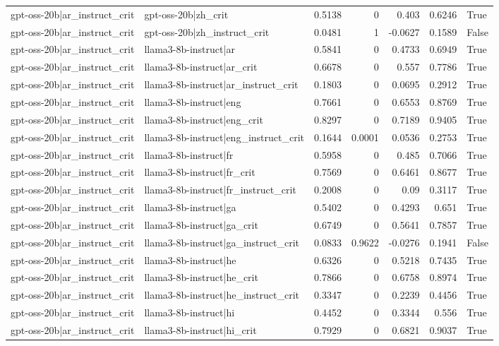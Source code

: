 \begin{table}
\begin{tabular}{l l r r r r l}
gpt-oss-20b|ar_instruct_crit & gpt-oss-20b|zh_crit & 0.5138 & 0 & 0.403 & 0.6246 & True \\
gpt-oss-20b|ar_instruct_crit & gpt-oss-20b|zh_instruct_crit & 0.0481 & 1 & -0.0627 & 0.1589 & False \\
gpt-oss-20b|ar_instruct_crit & llama3-8b-instruct|ar & 0.5841 & 0 & 0.4733 & 0.6949 & True \\
gpt-oss-20b|ar_instruct_crit & llama3-8b-instruct|ar_crit & 0.6678 & 0 & 0.557 & 0.7786 & True \\
gpt-oss-20b|ar_instruct_crit & llama3-8b-instruct|ar_instruct_crit & 0.1803 & 0 & 0.0695 & 0.2912 & True \\
gpt-oss-20b|ar_instruct_crit & llama3-8b-instruct|eng & 0.7661 & 0 & 0.6553 & 0.8769 & True \\
gpt-oss-20b|ar_instruct_crit & llama3-8b-instruct|eng_crit & 0.8297 & 0 & 0.7189 & 0.9405 & True \\
gpt-oss-20b|ar_instruct_crit & llama3-8b-instruct|eng_instruct_crit & 0.1644 & 0.0001 & 0.0536 & 0.2753 & True \\
gpt-oss-20b|ar_instruct_crit & llama3-8b-instruct|fr & 0.5958 & 0 & 0.485 & 0.7066 & True \\
gpt-oss-20b|ar_instruct_crit & llama3-8b-instruct|fr_crit & 0.7569 & 0 & 0.6461 & 0.8677 & True \\
gpt-oss-20b|ar_instruct_crit & llama3-8b-instruct|fr_instruct_crit & 0.2008 & 0 & 0.09 & 0.3117 & True \\
gpt-oss-20b|ar_instruct_crit & llama3-8b-instruct|ga & 0.5402 & 0 & 0.4293 & 0.651 & True \\
gpt-oss-20b|ar_instruct_crit & llama3-8b-instruct|ga_crit & 0.6749 & 0 & 0.5641 & 0.7857 & True \\
gpt-oss-20b|ar_instruct_crit & llama3-8b-instruct|ga_instruct_crit & 0.0833 & 0.9622 & -0.0276 & 0.1941 & False \\
gpt-oss-20b|ar_instruct_crit & llama3-8b-instruct|he & 0.6326 & 0 & 0.5218 & 0.7435 & True \\
gpt-oss-20b|ar_instruct_crit & llama3-8b-instruct|he_crit & 0.7866 & 0 & 0.6758 & 0.8974 & True \\
gpt-oss-20b|ar_instruct_crit & llama3-8b-instruct|he_instruct_crit & 0.3347 & 0 & 0.2239 & 0.4456 & True \\
gpt-oss-20b|ar_instruct_crit & llama3-8b-instruct|hi & 0.4452 & 0 & 0.3344 & 0.556 & True \\
gpt-oss-20b|ar_instruct_crit & llama3-8b-instruct|hi_crit & 0.7929 & 0 & 0.6821 & 0.9037 & True \\

\end{tabular}
\end{table}
